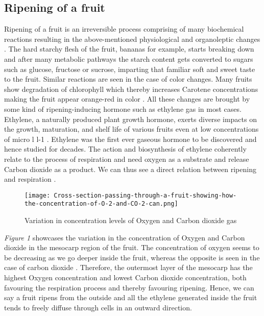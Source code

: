 \documentclass[10pt, a4paper]{article}
\begin{document}
\subsection{Ripening of a fruit}
Ripening of a fruit is an irreversible process comprising of many biochemical reactions resulting in the above-mentioned physiological and organoleptic changes \cite{article}. The hard starchy flesh of the fruit, bananas for example, starts breaking down and after many metabolic pathways \cite{seymour2012biochemistry} the starch content gets converted to sugars such as glucose, fructose or sucrose, imparting that familiar soft and sweet taste to the fruit. Similar reactions are seen in the case of color changes. Many fruits show degradation of chlorophyll which thereby increases Carotene concentrations making the fruit appear orange-red in color \cite{seymour2012biochemistry}. All these changes are brought by some kind of ripening-inducing hormone such as ethylene gas in most cases. Ethylene, a naturally produced plant growth hormone, exerts diverse impacts on the growth, maturation, and shelf life of various fruits even at low concentrations of micro l l-1 \cite{SALTVEIT1999279}. Ethylene was the first ever gaseous hormone to be discovered and hence studied for decades. The action and biosynthesis of ethylene \cite{adams1979ethylene} coherently relate to the process of respiration and need oxygen as a substrate and release Carbon dioxide as a product. We can thus see a direct relation between ripening and respiration \cite{tripathi2016fruit}. 
\begin{figure}[H]
    \centering
    \texttt{[image: Cross-section-passing-through-a-fruit-showing-how-the-concentration-of-O-2-and-CO-2-can.png]}
    \caption{Variation in concentration levels of Oxygen and Carbon dioxide gas}
\end{figure}
 \emph{Figure 1} showcases the variation in the concentration of Oxygen and Carbon dioxide in the mesocarp region of the fruit. The concentration of oxygen seems to be decreasing as we go deeper inside the fruit, whereas the opposite is seen in the case of carbon dioxide \cite{inbook}. Therefore, the outermost layer of the mesocarp has the highest Oxygen concentration and lowest Carbon dioxide concentration, both favouring the respiration process and thereby favouring ripening. Hence, we can say a fruit ripens from the outside and all the ethylene generated inside the fruit tends to freely diffuse through cells \cite{alexander2002ethylene} in an outward direction.
\end{document}
